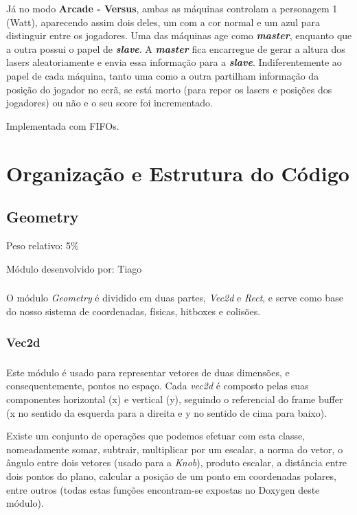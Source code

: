 \documentclass{report}
\begin{document}
Já no modo \textbf{Arcade - Versus}, ambas as máquinas controlam a personagem 1 (Watt), aparecendo assim dois deles, um com a cor normal e um azul para distinguir entre os jogadores. Uma das máquinas age como \textbf{\textit{master}}, enquanto que a outra possui o papel de \textbf{\textit{slave}}. A \textbf{\textit{master}} fica encarregue de gerar a altura dos lasers aleatoriamente e envia essa informação para a \textbf{\textit{slave}}. Indiferentemente ao papel de cada máquina, tanto uma como a outra partilham informação da posição do jogador no ecrã, se está morto (para repor os lasers e posições dos jogadores) ou não e o seu score foi incrementado.

Implementada com FIFOs.

\chapter{Organização e Estrutura do Código}

\section{Geometry}

Peso relativo: 5\%

Módulo desenvolvido por: Tiago

\paragraph{}
O módulo \textit{Geometry} é dividido em duas partes, \textit{Vec2d} e \textit{Rect}, e serve como base do nosso sistema de coordenadas, físicas, hitboxes e colisões. 
\subsection{Vec2d}

\paragraph{}
Este módulo é usado para representar vetores de duas dimensões, e consequentemente, pontos no espaço. Cada \textit{vec2d} é composto pelas suas componentes horizontal (x) e vertical (y), seguindo o referencial do frame buffer (x no sentido da esquerda para a direita e y no sentido de cima para baixo).

Existe um conjunto de operações que podemos efetuar com esta classe, nomeadamente somar, subtrair, multiplicar por um escalar, a norma do vetor, o ângulo entre dois vetores (usado para a \textit{Knob}), produto escalar, a distância entre dois pontos do plano, calcular a posição de um ponto em coordenadas polares, entre outros (todas estas funções encontram-se expostas no Doxygen deste módulo).
\end{document}
